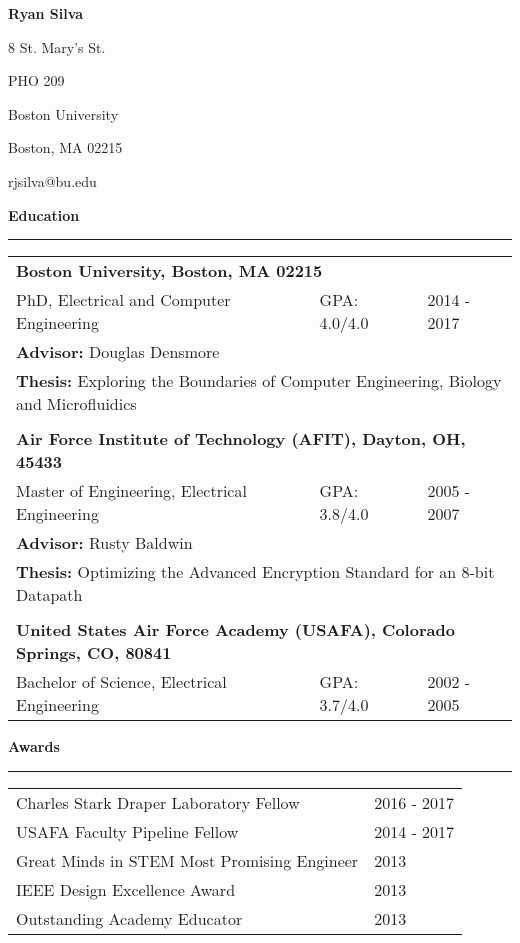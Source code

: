 
{\centering
\Large
\textbf{Ryan Silva}

\normalsize
8 St. Mary's St.

PHO 209

Boston University

Boston, MA 02215

rjsilva@bu.edu\\[1cm]
}
\large
\textbf{Education}\\
\rule{\textwidth}{1pt}

\begin{table}[h!]
\centering
\small
\begin{tabular}{ p{9.5cm} p{2.5cm} p{4.5cm}}
	\multicolumn{3}{l}{\textbf{Boston University, Boston, MA 02215}}\\
	PhD, Electrical and Computer Engineering & GPA: 4.0/4.0 & 2014 - 2017\\
	\multicolumn{3}{l}{\textbf{Advisor: }Douglas Densmore}\\
	\multicolumn{3}{l}{\textbf{Thesis: }Exploring the Boundaries of Computer Engineering, Biology and Microfluidics}\\
	 & & \\
	\multicolumn{3}{l}{\textbf{Air Force Institute of Technology (AFIT), Dayton, OH, 45433}}\\
	Master of Engineering, Electrical Engineering & GPA: 3.8/4.0 & 2005 - 2007\\
	\multicolumn{3}{l}{\textbf{Advisor: }Rusty Baldwin}\\
	\multicolumn{3}{l}{\textbf{Thesis: }Optimizing the Advanced Encryption Standard for an 8-bit Datapath}\\
	 & & \\
	\multicolumn{3}{l}{\textbf{United States Air Force Academy (USAFA), Colorado Springs, CO, 80841}}\\
	Bachelor of Science, Electrical Engineering & GPA: 3.7/4.0 & 2002 - 2005\\
\end{tabular}
\end{table}

\large
\textbf{Awards}\\
\rule{\textwidth}{1pt}

\begin{table}[h!]
\centering
\small
\begin{tabular}{ p{12.5cm} p{4.5cm}}
	Charles Stark Draper Laboratory Fellow & 2016 - 2017 \\
	USAFA Faculty Pipeline Fellow & 2014 - 2017 \\
	Great Minds in STEM Most Promising Engineer & 2013 \\
	IEEE Design Excellence Award & 2013 \\
	Outstanding Academy Educator & 2013
\end{tabular}
\end{table}

